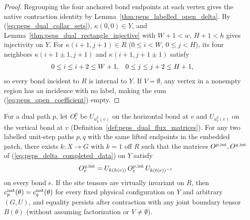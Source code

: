 \begin{proof}\leanok
    Regrouping the four anchored bond endpoints at each vertex gives the
    native contraction identity by Lemma~\ref{thm:peps_labelled_open_delta}.
    By (\ref{eq:peps_dual_collar_sets}), $\kappa(0,0)\in Y$, and
    Lemma~\ref{thm:peps_dual_rectangle_injective} with $W+1<w$, $H+1<h$
    gives injectivity on $Y$. For $\kappa(i+1,j+1)\in R$ ($0\leq i<W$,
    $0\leq j<H$), its four neighbors $\kappa(i+1\pm1,j+1)$ and
    $\kappa(i+1,j+1\pm1)$ satisfy
    \begin{align}
        0 & \leq i\leq i+2\leq W+1, & 0 & \leq j\leq j+2\leq H+1,
        \notag
    \end{align}
    so every bond incident to $R$ is internal to $Y$. If $V=\emptyset$, any
    vertex in a nonempty region has an incidence with no label, making the
    sum (\ref{eq:peps_open_coefficient}) empty.
\end{proof}
\begin{lemma}
    \label{thm:peps_dual_collar_open}
    \leanok
    For a dual path $p$, let $O^p_e$ be $U_{u_h^p(v)}$ on the horizontal
    bond at $v$ and $U_{u_v^p(v)}$ on the vertical bond at $v$
    (Definition~\ref{def:peps_dual_flux_matrices}). For any two labelled
    unit-step paths $p,q$ with the same lifted endpoints in the embedded
    patch, there exists $k:X\to G$ with $k=1$ off $R$ such that the matrices
    $O^{p,\rm int},O^{q,\rm int}$ of (\ref{eq:peps_delta_completed_data}) on
    $Y$ satisfy
    \begin{align}
        O^{q,\rm int}_e=U_{k(h(e))}\,O^{p,\rm int}_e\,U_{k(t(e))^{-1}}
        \label{eq:peps_collar_internal_gauge}
    \end{align}
    on every bond $e$. If the site tensors are virtually invariant on $R$,
    then $c^{\rm nat}_p(\theta)=c^{\rm nat}_q(\theta)$ for every fixed
    physical configuration on $Y$ and arbitrary $(G,U)$, and equality
    persists after contraction with any joint boundary tensor $B(\theta)$
    (without assuming factorization or $V\neq\emptyset$).
\end{lemma}
